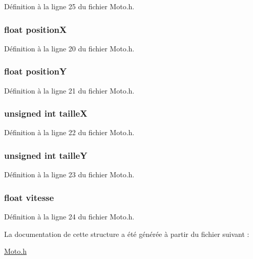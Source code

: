 Définition à la ligne 25 du fichier Moto.\-h.

\hypertarget{struct_moto_a79a982036e5591bf27af7cc2edcd6f4c}{
\subsubsection[{position\-X}]{\setlength{\rightskip}{0pt plus 5cm}float position\-X}}\label{struct_moto_a79a982036e5591bf27af7cc2edcd6f4c}


Définition à la ligne 20 du fichier Moto.\-h.

\hypertarget{struct_moto_ad17be35b83017d6dc83074e6b8d21207}{
\subsubsection[{position\-Y}]{\setlength{\rightskip}{0pt plus 5cm}float position\-Y}}\label{struct_moto_ad17be35b83017d6dc83074e6b8d21207}


Définition à la ligne 21 du fichier Moto.\-h.

\hypertarget{struct_moto_a14a7f2008ff990cae95babeb28176bad}{
\subsubsection[{taille\-X}]{\setlength{\rightskip}{0pt plus 5cm}unsigned int taille\-X}}\label{struct_moto_a14a7f2008ff990cae95babeb28176bad}


Définition à la ligne 22 du fichier Moto.\-h.

\hypertarget{struct_moto_ab277c464cec35f230262c48fec89a566}{
\subsubsection[{taille\-Y}]{\setlength{\rightskip}{0pt plus 5cm}unsigned int taille\-Y}}\label{struct_moto_ab277c464cec35f230262c48fec89a566}


Définition à la ligne 23 du fichier Moto.\-h.

\hypertarget{struct_moto_aef55e1775d611bfea0196692da1a0bc5}{
\subsubsection[{vitesse}]{\setlength{\rightskip}{0pt plus 5cm}float vitesse}}\label{struct_moto_aef55e1775d611bfea0196692da1a0bc5}


Définition à la ligne 24 du fichier Moto.\-h.



La documentation de cette structure a été générée à partir du fichier suivant \-:\begin{DoxyCompactItemize}
\item 
\hyperlink{_moto_8h}{Moto.\-h}\end{DoxyCompactItemize}
